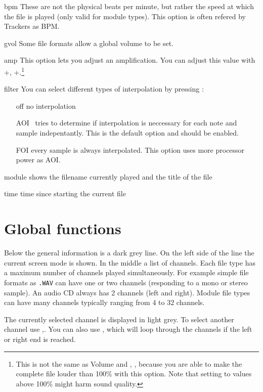 \begin{dojlist}
\item[bpm] These are not the physical beats per minute, but rather the speed
at which the file is played (only valid for module types). This option is
often refered by Trackers as BPM.
\item[gvol] Some file formats allow a global volume to be set.
\item[amp] This option lets you adjust an amplification. You can adjust this value with
+, +.\footnote{This is not the same
as Volume and , , because you are able to make the complete
file louder than 100\% with this option. Note that setting to values above
100\% might harm sound quality.}
\item[filter] You can select different types of interpolation by pressing :
\begin{itemize}
\item[off] no interpolation
\item[AOI] \cp\ tries to determine if interpolation is neccessary for each
note and sample indepentantly. This is the default option and should be enabled.
\item[FOI] every sample is always interpolated. This option uses more processor
power as AOI.
\end{itemize}
\item[module] shows the filename currently played and the title of the file
\item[time] time since starting the current file
\end{dojlist}

\section{Global functions}
Below the general information is a dark grey line. On the left side of the line
the current screen mode is shown. In the middle a list of channels. Each file
type has a maximum number of channels played simultaneously. For example simple
file formats as \texttt{.WAV} can have one or two channels (responding to a mono
or stereo sample). An audio CD always has 2 channels (left and right). Module
file types can have many channels typically ranging from 4 to 32 channels.

The currently selected channel is displayed in light grey. To select another
channel use \keys{$\leftarrow$},\keys{$\rightarrow$}. You can also use
\keys{$\uparrow$},\keys{$\downarrow$} which will loop through the channels if
the left or right end is reached.

